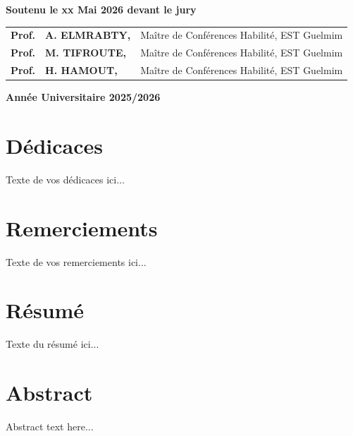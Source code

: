 \documentclass[12pt,a4paper,oneside]{report}
\begin{document}
\begin{titlepage}
\begin{center}
\vspace{0.55cm}

{\small\bfseries Soutenu le xx Mai 2026 devant le jury}

\vspace{0.30cm}

\footnotesize
\begin{tabular}{lll}
\textbf{Prof.} & \textbf{A. ELMRABTY,} & Maître de Conférences Habilité, EST Guelmim \\[0.08cm]
\textbf{Prof.} & \textbf{M. TIFROUTE,} & Maître de Conférences Habilité, EST Guelmim \\[0.08cm]
\textbf{Prof.} & \textbf{H. HAMOUT,} & Maître de Conférences Habilité, EST Guelmim
\end{tabular}

\vfill

{\small\bfseries\color{ReportText} Année Universitaire 2025/2026}

\end{center}

\restoregeometry
\end{titlepage}





\chapter*{Dédicaces}
Texte de vos dédicaces ici...

\chapter*{Remerciements}
Texte de vos remerciements ici...

\chapter*{Résumé}
Texte du résumé ici...

\chapter*{Abstract}
Abstract text here...
\end{document}
